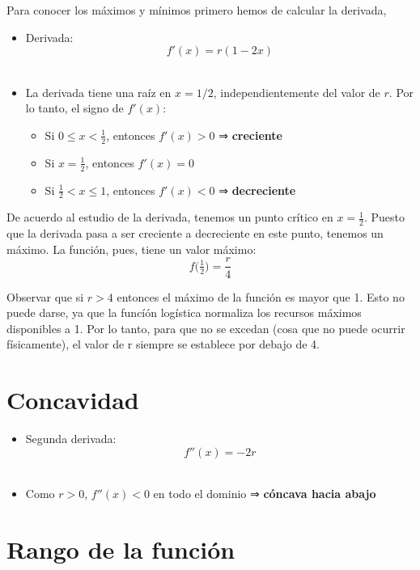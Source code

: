 \documentclass[
  10pt,
  a4paper,
  DIV=11,
  numbers=noendperiod,
  open=any]{scrreprt}
\providecommand{\tightlist}{%
  \setlength{\itemsep}{0pt}\setlength{\parskip}{0pt}}
\numberwithin{equation}{chapter}
\numberwithin{equation}{chapter}
\renewcommand{\[}{\begin{equation}}
\renewcommand{\]}{\end{equation}}
\begin{document}
Para conocer los máximos y mínimos primero hemos de calcular la
derivada,

\begin{itemize}
\tightlist
\item
  Derivada:\\
  \[f'(x) = r(1 - 2x)\]\\
\item
  La derivada tiene una raíz en \(x=1/2\), independientemente del valor
  de \(r\). Por lo tanto, el signo de \(f'(x)\):

  \begin{itemize}
  \tightlist
  \item
    Si \(0 \le x < \tfrac12\), entonces \(f'(x) > 0\) ⇒
    \textbf{creciente}\\
  \item
    Si \(x = \tfrac12\), entonces \(f'(x) = 0\)\\
  \item
    Si \(\tfrac12 < x \le 1\), entonces \(f'(x) < 0\) ⇒
    \textbf{decreciente}
  \end{itemize}
\end{itemize}

De acuerdo al estudio de la derivada, tenemos un punto crítico en
\(x = \tfrac12\). Puesto que la derivada pasa a ser creciente a
decreciente en este punto, tenemos un máximo. La función, pues, tiene un
valor máximo:\\
\[f\bigl(\tfrac12\bigr) = \frac{r}{4}\]

Observar que si \(r>4\) entonces el máximo de la función es mayor que 1.
Esto no puede darse, ya que la funcíón logística normaliza los recursos
máximos disponibles a 1. Por lo tanto, para que no se excedan (cosa que
no puede ocurrir físicamente), el valor de r siempre se establece por
debajo de 4.

\section{Concavidad}\label{concavidad}

\begin{itemize}
\tightlist
\item
  Segunda derivada:\\
  \[f''(x) = -2r\]\\
\item
  Como \(r>0\), \(f''(x)<0\) en todo el dominio ⇒ \textbf{cóncava hacia
  abajo}
\end{itemize}

\section{Rango de la función}\label{rango-de-la-funciuxf3n}
\end{document}
